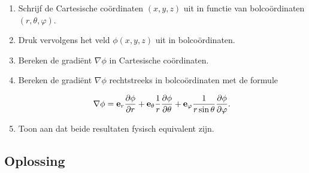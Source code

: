\documentclass[11pt,a4paper]{article}
\begin{document}
    \begin{enumerate}
        \item Schrijf de Cartesische coördinaten \((x,y,z)\) uit in functie van bolcoördinaten \((r,\theta,\varphi)\).

        \item Druk vervolgens het veld \(\phi(x,y,z)\) uit in bolcoördinaten.

        \item Bereken de gradiënt \(\nabla \phi\) in Cartesische coördinaten.

        \item Bereken de gradiënt \(\nabla \phi\) rechtstreeks in bolcoördinaten met de formule

        \[
            \nabla \phi =
            \vb{e}_r \pdv{\phi}{r} +
            \vb{e}_\theta \frac{1}{r}\pdv{\phi}{\theta} +
            \vb{e}_\varphi \frac{1}{r\sin\theta}\pdv{\phi}{\varphi}.
        \]

        \item Toon aan dat beide resultaten fysisch equivalent zijn.
    \end{enumerate}



    \subsection*{Oplossing}
\end{document}

